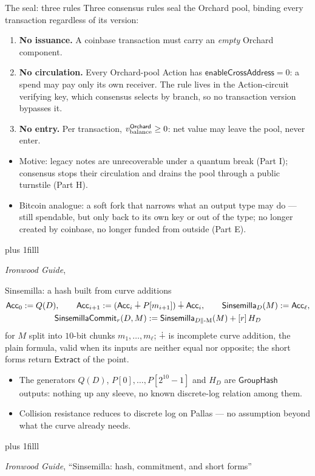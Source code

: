 \documentclass[aspectratio=169,11pt]{beamer}
\newcommand{\Extract}{\ensuremath{\mathsf{Extract}}}
\newcommand{\GroupHash}{\ensuremath{\mathsf{GroupHash}}}
\newcommand{\src}[1]{\par\vskip0pt plus 1filll
  {\fontsize{6}{7.2}\selectfont\color{arbdim}\raggedright #1\par}}
\begin{document}
\begin{frame}{The seal: three rules}
Three consensus rules seal the Orchard pool, binding every transaction
regardless of its version:
\begin{enumerate}
  \item \textbf{No issuance.} A coinbase transaction must carry an
    \emph{empty} Orchard component.
  \item \textbf{No circulation.} Every Orchard-pool Action has
    $\mathsf{enableCrossAddress} = 0$: a spend may pay only its own
    receiver. The rule lives in the Action-circuit verifying key, which
    consensus selects by branch, so no transaction version bypasses it.
  \item \textbf{No entry.} Per transaction, $v_{\mathrm{balance}}^{\mathsf{Orchard}} \ge 0$: net value
    may leave the pool, never enter.
\end{enumerate}
\smallskip
\begin{itemize}
  \item Motive: legacy notes are unrecoverable under a quantum break
    (Part I); consensus stops their circulation and drains the pool
    through a public turnstile (Part H).
  \item Bitcoin analogue: a soft fork that narrows what an output type
    may do --- still spendable, but only back to its own key or out of
    the type; no longer created by coinbase, no longer funded from
    outside (Part E).
\end{itemize}
\src{\emph{Ironwood Guide}, \smash[b]{``Chain state and pool rules''}}
\end{frame}

\begin{frame}{Sinsemilla: a hash built from curve additions}
\vspace*{-6pt}
\begin{gather*}
\mathsf{Acc}_0 := Q(D), \qquad
\mathsf{Acc}_{i+1} := (\mathsf{Acc}_i \dotplus P[m_{i+1}]) \dotplus \mathsf{Acc}_i, \qquad
\mathsf{Sinsemilla}_D(M) := \mathsf{Acc}_\ell,\\
\mathsf{SinsemillaCommit}_r(D, M) :=
  \mathsf{Sinsemilla}_{D\|\text{-M}}(M) + [r]\,H_D
\end{gather*}
for $M$ split into $10$-bit chunks $m_1, \dots, m_\ell$; $\dotplus$ is
incomplete curve addition, the plain formula, valid when its inputs are
neither equal nor opposite; the short forms return $\Extract$ of the
point.
\vspace*{-2pt}
\begin{itemize}
  \item The generators $Q(D)$, $P[0], \dots, P[2^{10} - 1]$ and $H_D$
    are $\GroupHash$ outputs: nothing up any sleeve, no known
    discrete-log relation among them.
  \item Collision resistance reduces to discrete log on Pallas --- no
    assumption beyond what the curve already needs.
\end{itemize}
\src{\emph{Ironwood Guide}, ``Sinsemilla: hash, commitment, and short
  forms''}
\end{frame}
\end{document}

